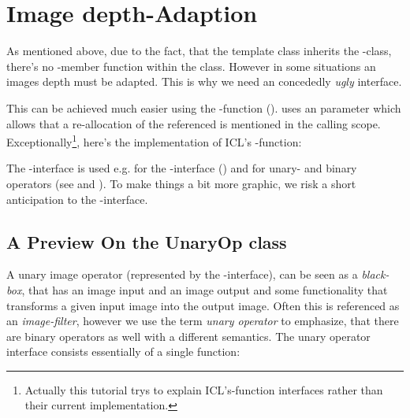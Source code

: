 \section {\label{sec:depth-adaption}Image depth-Adaption}

As mentioned above, due to the fact, that the  template class inherits the -class, there's no -member function within the  class. However in some situations an images depth must be adapted. This is why we need an concededly \emph{ugly}  interface.


This can be achieved much easier using the -function (). 
 uses an  parameter which allows that a re-allocation of the referenced  is mentioned in the calling scope. Exceptionally\footnote{Actually this tutorial trys to explain ICL's-function interfaces rather than their current implementation.}, here's the implementation of ICL's -function:


The -interface is used e.g. for the -interface () and for unary- and binary operators (see  and ). To make things a bit more graphic, we risk a short anticipation to the -interface.\\

\subsection{A Preview On the UnaryOp class\label{subsec:unary-op-preview}}
A unary image operator (represented by the -interface), can be seen as a \emph{black-box}, that has an image input and an image output and some functionality that transforms a given input image into the output image. Often this is referenced as an \emph{image-filter}, however we use the term \emph{unary operator} to emphasize, that there are binary operators as well with a different semantics. The unary operator interface consists essentially of a single function:

